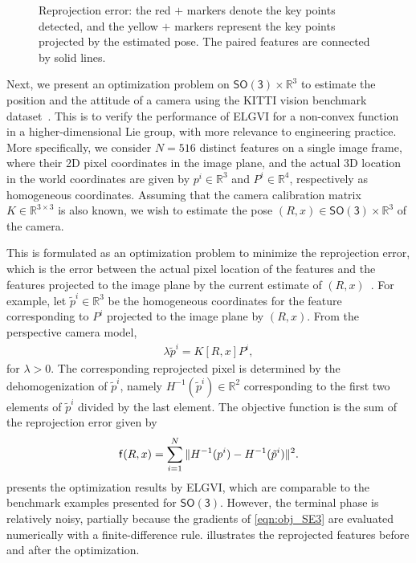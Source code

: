 \documentclass[letterpaper, 10pt, conference]{ieeeconf}
\newcommand{\SO}{\ensuremath{\mathsf{SO(3)}}}
\renewcommand{\Re}{\ensuremath{\mathbb{R}}}
\begin{document}
\begin{figure}
    \centerline{
    }
    \centerline{
    }
    \caption{Reprojection error: the red $+$ markers denote the key points detected, and the yellow $+$ markers represent the key points projected by the estimated pose. The paired features are connected by solid lines. }\label{fig:KITTI}
\end{figure}


Next, we present an optimization problem on $\SO\times\Re^3$ to estimate the position and the attitude of a camera using the KITTI vision benchmark dataset~\cite{Geiger2013IJRR}.
This is to verify the performance of ELGVI for a non-convex function in a higher-dimensional Lie group, with more relevance to engineering practice. 
More specifically, we consider $N=516$ distinct features on a single image frame, where their 2D pixel coordinates in the image plane, and the actual 3D location in the world coordinates are given by $p^i\in\Re^3$ and $P^i\in\Re^4$, respectively as homogeneous coordinates. 
Assuming that the camera calibration matrix $K\in\Re^{3\times 3}$ is also known, we wish to estimate the pose $(R,x)\in\SO\times \Re^3$ of the camera.  

This is formulated as an optimization problem to minimize the reprojection error, which is the error between the actual pixel location of the features and the features projected to the image plane by the current estimate of $(R,x)$~\cite{ma2012invitation}.
For example, let $\tilde p^i\in\Re^3$ be the homogeneous coordinates for the feature corresponding to $P^i$ projected to the image plane by $(R,x)$. 
From the perspective camera model, 
\begin{align*}
    \lambda \tilde p^i = K[R, x]P^i,
\end{align*}
for $\lambda >0$.
The corresponding reprojected pixel is determined by the dehomogenization  of $\tilde p^i$, namely $H^{-1}(\tilde p^i)\in\Re^2$ corresponding to the first two elements of $\tilde p^i$ divided by the last element. 
The objective function is the sum of the reprojection error given by
\begin{align}
    \mathsf{f} (R,x) =  \sum_{i=1}^N \| H^{-1}(p^i) - H^{-1}(\tilde p^i)\|^2.\label{eqn:obj_SE3}
\end{align}
 presents the optimization results by ELGVI, which are comparable to the benchmark examples presented for $\SO$. 
However, the terminal phase is relatively noisy, partially because the gradients of \eqref{eqn:obj_SE3} are evaluated numerically with a finite-difference rule. 
 illustrates the reprojected features before and after the optimization. 
\end{document}
